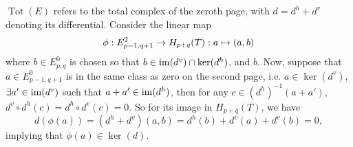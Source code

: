\subsection{}
$\operatorname{Tot}(E)$ refers to the total complex of the zeroth page, with $d=d^h+d^v$ denoting its differential. Consider the linear map 
\[\phi:E^2_{p-1,q+1}\rightarrow H_{p+q}(T):a\mapsto(a,b)\]
where $b\in E^0_{p,q}$ is chosen so that $b\in\operatorname{\operatorname{im}}(d^v)\cap\ker(d^h)$, and $b$. 
Now, suppose that $a\in E^0_{p-1,q+1}$ is in the same class as zero on the second page, i.e. $a\in\ker(d^v)$, $\exists a'\in\operatorname{\operatorname{im}}(d^v)$ such that $a+a'\in\operatorname{\operatorname{im}}(d^h)$, then for any $c\in(d^h)^{-1}(a+a')$, $d^v\circ d^h(c)=d^h\circ d^v(c)=0$. So for its image in $H_{p+q}(T)$, we have
\[d(\phi(a))=(d^h+d^v)(a,b)=d^h(b)+d^v(a)+d^v(b)=0,\]
implying that $\phi(a)\in\ker(d)$.